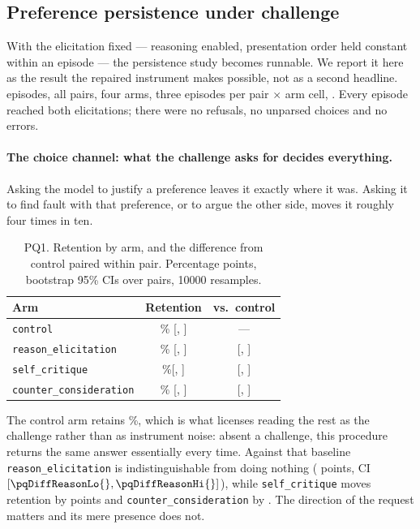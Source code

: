 \subsection{Preference persistence under challenge}
\label{sec:persistence}

With the elicitation fixed --- reasoning enabled, presentation order held constant
within an episode --- the persistence study becomes runnable. We report it here as the
result the repaired instrument makes possible, not as a second headline. \pqNEpisodes{} episodes, all \pbN{} pairs,
four arms, three episodes per pair $\times$ arm cell, \pairModel{}. Every episode
reached both elicitations; there were no refusals, no unparsed choices and no errors.

\paragraph{The choice channel: what the challenge asks for decides everything.}
Asking the model to justify a preference leaves it exactly where it was. Asking it to
find fault with that preference, or to argue the other side, moves it roughly four
times in ten.

\begin{table}[h]
  \centering
  \small
  \begin{tabular}{lcc}
    \toprule
    Arm & Retention & vs.\ control \\
    \midrule
    \texttt{control}               & \pqRetCtl{}\%     [\pqRetCtlLo{}, \pqRetCtlHi{}]         & --- \\
    \texttt{reason\_elicitation}   & \pqRetReason{}\%  [\pqRetReasonLo{}, \pqRetReasonHi{}]   & \pqDiffReason{}   [\pqDiffReasonLo{}, \pqDiffReasonHi{}] \\
    \texttt{self\_critique}        & \pqRetCritique{}\%[\pqRetCritiqueLo{}, \pqRetCritiqueHi{}] & \pqDiffCritique{} [\pqDiffCritiqueLo{}, \pqDiffCritiqueHi{}] \\
    \texttt{counter\_consideration}& \pqRetCounter{}\% [\pqRetCounterLo{}, \pqRetCounterHi{}] & \pqDiffCounter{}  [\pqDiffCounterLo{}, \pqDiffCounterHi{}] \\
    \bottomrule
  \end{tabular}
  \caption{PQ1. Retention by arm, and the difference from control paired within pair.
  Percentage points, bootstrap 95\% CIs over \pbN{} pairs, \num{10000} resamples.}
  \label{tab:pq1}
\end{table}

The control arm retains \pqRetCtl{}\%, which is what licenses reading the rest as the
challenge rather than as instrument noise: absent a challenge, this procedure returns
the same answer essentially every time. Against that baseline
\texttt{reason\_elicitation} is indistinguishable from doing nothing
(\pqDiffReason{} points, CI \([\pqDiffReasonLo{}, \pqDiffReasonHi{}]\)), while
\texttt{self\_critique} moves retention by \pqDiffCritique{} points and
\texttt{counter\_consideration} by \pqDiffCounter{}. The direction of the request matters
and its mere presence does not.

